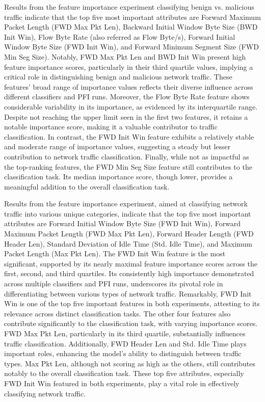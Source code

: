 \documentclass[lettersize,journal]{IEEEtran}
\begin{document}
Results from the feature importance experiment classifying benign vs. malicious traffic indicate that the top five most important attributes are Forward Maximum Packet Length (FWD Max Pkt Len), Backward Initial Window Byte Size (BWD Init Win), Flow Byte Rate (also referred as Flow Byte/s), Forward Initial Window Byte Size (FWD Init Win), and Forward Minimum Segment Size (FWD Min Seg Size). Notably, FWD Max Pkt Len and BWD Init Win present high feature importance scores, particularly in their third quartile values, implying a critical role in distinguishing benign and malicious network traffic. These features' broad range of importance values reflects their diverse influence across different classifiers and \ac{PFI} runs. Moreover, the Flow Byte Rate feature shows considerable variability in its importance, as evidenced by its interquartile range. Despite not reaching the upper limit seen in the first two features, it retains a notable importance score, making it a valuable contributor to traffic classification. In contrast, the FWD Init Win feature exhibits a relatively stable and moderate range of importance values, suggesting a steady but lesser contribution to network traffic classification. Finally, while not as impactful as the top-ranking features, the FWD Min Seg Size feature still contributes to the classification task. Its median importance score, though lower, provides a meaningful addition to the overall classification task. 

Results from the feature importance experiment, aimed at classifying network traffic into various unique categories, indicate that the top five most important attributes are Forward Initial Window Byte Size (FWD Init Win), Forward Maximum Packet Length (FWD Max Pkt Len), Forward Header Length (FWD Header Len), Standard Deviation of Idle Time (Std. Idle Time), and Maximum Packet Length (Max Pkt Len). The FWD Init Win feature is the most significant, supported by its nearly maximal feature importance scores across the first, second, and third quartiles. Its consistently high importance demonstrated across multiple classifiers and \ac{PFI} runs, underscores its pivotal role in differentiating between various types of network traffic. Remarkably, FWD Init Win is one of the top five important features in both experiments, attesting to its relevance across distinct classification tasks. The other four features also contribute significantly to the classification task, with varying importance scores. FWD Max Pkt Len, particularly in its third quartile, substantially influences traffic classification. Additionally, FWD Header Len and Std. Idle Time plays important roles, enhancing the model's ability to distinguish between traffic types. Max Pkt Len, although not scoring as high as the others, still contributes notably to the overall classification task. These top five attributes, especially FWD Init Win featured in both experiments, play a vital role in effectively classifying network traffic.
\end{document}
